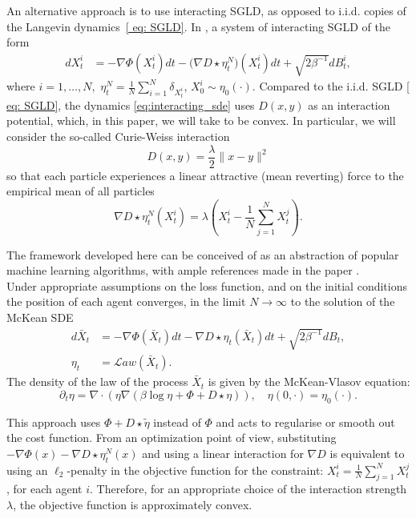 \documentclass{article}
\begin{document}
An alternative approach is to use interacting SGLD, as opposed to
i.i.d. copies of the Langevin dynamics~\ref{ eq: SGLD}. In \cite{kantas2019sharpflatshallowweakly}, a system of interacting SGLD of the form 
\begin{align}
dX_{t}^{i} & =-\nabla\Phi(X_{t}^{i})dt-\big(\nabla D\star\eta_{t}^{N}\big)(X_{t}^{i})dt+\sqrt{2\beta^{-1}}dB_{t}^{i},\label{eq:interacting_sde}
\end{align}
where $i=1,\ldots,N,$ $\eta_{t}^{N}=\frac{1}{N}\sum_{i=1}^{N}\delta_{X_{t}^{i}}$,
$X_{0}^{i}\sim\eta_{0}(\cdot)$. Compared to the i.i.d. SGLD \ref{ eq: SGLD},
the dynamics \ref{eq:interacting_sde} uses $D(x,y)$ as an interaction
potential, which, in this paper, we will take to be convex. In particular,
we will consider the so-called Curie-Weiss interaction
\begin{equation}
D(x,y)=\frac{\lambda}{2}\|x-y\|^{2}\label{e:inter}
\end{equation}
so that each particle experiences a linear attractive (mean reverting)
force to the empirical mean of all particles 
\[
\nabla D\star\eta_{t}^{N}(X_{t}^{i})=\lambda\left(X_{t}^{i}-\frac{1}{N}\sum_{j=1}^{N}X_{t}^{j}\right).
\]

The framework developed here can be conceived of as an abstraction of popular
machine learning algorithms, with ample references made in the paper \cite[p. 4]{kantas2019sharpflatshallowweaklSy}.\\

Under appropriate assumptions
on the loss function, and on the initial conditions the position of
each agent converges, in the limit $N\rightarrow\infty$ to the solution
of the McKean SDE 
\begin{align*}
d\bar{X}_{t} & =-\nabla\Phi(\bar{X}_{t})dt-\nabla D\star\eta_{t}(\bar{X}_{t})dt+\sqrt{2\beta^{-1}}dB_{t},\\
\eta_{t} & =\mathcal{L}aw\left(\bar{X}_{t}\right).
\end{align*}
The density of the law of the process $\bar{X}_{t}$ is given by the
McKean-Vlasov equation: 
\begin{equation}
\partial_{t}\eta=\nabla\cdot\left(\eta\nabla\left(\beta\log\eta+\Phi+D\star\eta\right)\right),\quad\eta(0,\cdot)=\eta_{0}(\cdot).\label{e:mc-vl}
\end{equation}

This approach uses $\Phi+D\star\tilde{\eta}$ instead of $\Phi$ and acts to regularise
or smooth out the cost function. From an optimization point of view,
substituting $-\nabla\Phi(x)-\nabla D\star\eta_{t}^{N}(x)$ and using
a linear interaction for $\nabla D$ is equivalent to using an $\ell_{2}$-penalty
in the objective function for the constraint: $X_{t}^{i}=\frac{1}{N}\sum_{j=1}^{N}X_{t}^{j}$,
for each agent $i$. Therefore, for an appropriate choice of the interaction
strength $\lambda$, the objective function is approximately convex.
\end{document}
